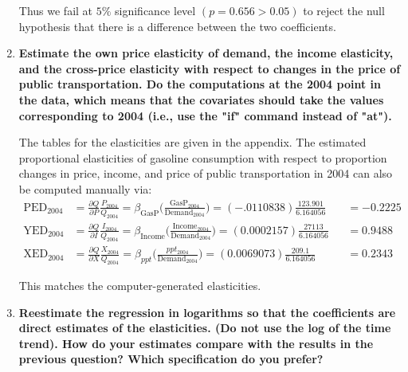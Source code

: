 \documentclass{article}
\begin{document}
\begin{enumerate}[label=\alph*.]
Thus we fail  at $5\%$ significance level $(p = 0.656 > 0.05)$ to reject the null hypothesis that there is a difference between the two coefficients. 



\item \textbf{Estimate the own price elasticity of demand, the income elasticity, and the cross-price elasticity with respect to changes in the price of public transportation. Do the computations at the 2004 point in the data, which means that the covariates should take the values corresponding to 2004 (i.e., use the "if" command instead of "at").}

The tables for the elasticities are given in the appendix. The estimated proportional elasticities of gasoline consumption  with respect to proportion changes in price, income, and price of public transportation in 2004 can also be computed manually via:
\begin{align*}
\text{PED}_{2004} &= \frac{\partial Q}{\partial P}\frac{P_{2004}}{Q_{2004}} = \beta_{\text{GasP}} \Big( \frac{\text{GasP}_{2004}}{\text{Demand}_{2004}} \Big)   = (-.0110838)\frac{123.901}{6.164056} &&= -0.2225 \\
\text{YED}_{2004} &= \frac{\partial Q}{ \partial I}\frac{I_{2004}}{Q_{2004}} = \beta_{\text{Income}} \Big( \frac{\text{Income}_{2004}} {\text{Demand}_{2004}} \Big) =(0.0002157)\frac{27113}{6.164056} &&= 0.9488 \\
\text{XED}_{2004} &= \frac{\partial Q}{ \partial X} \frac{X_{2004}}{Q_{2004}} = \beta_{ppt} \Big( \frac{ppt_{2004}}{\text{Demand}_{2004}} \Big) =  (	0.0069073) \frac{209.1}{6.164056} &&= 0.2343
\end{align*}

This matches the computer-generated elasticities.


\item \textbf{Reestimate the regression in logarithms so that the coefficients are direct estimates of the elasticities. (Do not use the log of the time trend). How do your estimates compare with the results in the previous question? Which specification do you prefer?}


\end{enumerate}
\end{document}
